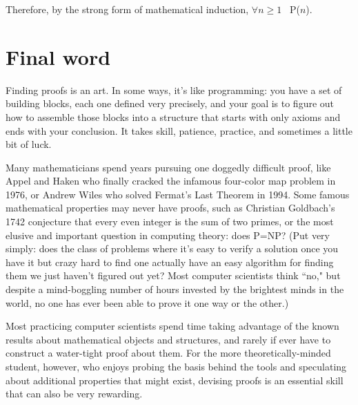 Therefore, by the strong form of mathematical induction, $\forall n \geq 1$
\ P($n$).

\section{Final word}

Finding proofs is an art. In some ways, it's like programming: you have a
set of building blocks, each one defined very precisely, and your goal is
to figure out how to assemble those blocks into a structure that starts
with only axioms and ends with your conclusion. It takes skill, patience,
practice, and sometimes a little bit of luck. 

Many mathematicians spend years pursuing one doggedly difficult proof, like
Appel and Haken who finally cracked the infamous four-color map problem in
1976, or Andrew Wiles who solved Fermat's Last Theorem in 1994. Some famous
mathematical properties may never have proofs, such as Christian Goldbach's
1742 conjecture that every even integer is the sum of two primes, or the
most elusive and important question in computing theory: does P=NP? (Put
very simply: does the class of problems where it's easy to verify a
solution once you have it but crazy hard to find one actually have an easy
algorithm for finding them we just haven't figured out yet? Most computer 
scientists think ``no," but despite a mind-boggling number of hours
invested by the brightest minds in the world, no one has ever been able to
prove it one way or the other.)

Most practicing computer scientists spend time taking advantage of the
known results about mathematical objects and structures, and rarely if ever
have to construct a water-tight proof about them. For the more
theoretically-minded student, however, who enjoys probing the basis behind
the tools and speculating about additional properties that might exist,
devising proofs is an essential skill that can also be very rewarding.
